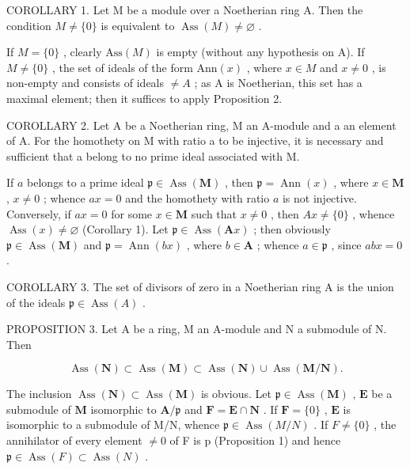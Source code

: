 COROLLARY 1. Let M be a module over a Noetherian ring A. Then the condition \(M \neq \{0\}\) is equivalent to \(\operatorname{Ass}(M) \neq \varnothing\) .

If \(M = \{0\}\) , clearly \(\text{Ass}(M)\) is empty (without any hypothesis on A). If \(M \neq \{0\}\) , the set of ideals of the form \(\text{Ann}(x)\) , where \(x \in M\) and \(x \neq 0\) , is non-empty and consists of ideals \(\neq A\) ; as A is Noetherian, this set has a maximal element; then it suffices to apply Proposition 2.

COROLLARY 2. Let A be a Noetherian ring, M an A-module and a an element of A. For the homothety on M with ratio a to be injective, it is necessary and sufficient that a belong to no prime ideal associated with M.

If \(a\) belongs to a prime ideal \(\mathfrak{p} \in \operatorname{Ass}(\mathbf{M})\) , then \(\mathfrak{p} = \operatorname{Ann}(x)\) , where \(x \in \mathbf{M}\) , \(x \neq 0\) ; whence \(ax = 0\) and the homothety with ratio \(a\) is not injective. Conversely, if \(ax = 0\) for some \(x \in \mathbf{M}\) such that \(x \neq 0\) , then \(Ax \neq \{0\}\) , whence \(\operatorname{Ass}(x) \neq \varnothing\) (Corollary 1). Let \(\mathfrak{p} \in \operatorname{Ass}(\mathbf{A}x)\) ; then obviously \(\mathfrak{p} \in \operatorname{Ass}(\mathbf{M})\) and \(\mathfrak{p} = \operatorname{Ann}(bx)\) , where \(b \in \mathbf{A}\) ; whence \(a \in \mathfrak{p}\) , since \(abx = 0\) .

COROLLARY 3. The set of divisors of zero in a Noetherian ring A is the union of the ideals \(\mathfrak{p} \in \operatorname{Ass}(A)\) .

PROPOSITION 3. Let A be a ring, M an A-module and N a submodule of N. Then

\[
\operatorname{Ass} (\mathbf {N}) \subset \operatorname{Ass} (\mathbf {M}) \subset \operatorname{Ass} (\mathbf {N}) \cup \operatorname{Ass} (\mathbf {M} / \mathbf {N}).\tag{2}
\]

The inclusion \(\operatorname{Ass}(\mathbf{N}) \subset \operatorname{Ass}(\mathbf{M})\) is obvious. Let \(\mathfrak{p} \in \operatorname{Ass}(\mathbf{M})\) , \(\mathbf{E}\) be a submodule of \(\mathbf{M}\) isomorphic to \(\mathbf{A} / \mathfrak{p}\) and \(\mathbf{F} = \mathbf{E} \cap \mathbf{N}\) . If \(\mathbf{F} = \{0\}\) , \(\mathbf{E}\) is isomorphic to a submodule of M/N, whence \(\mathfrak{p} \in \operatorname{Ass}(M/N)\) . If \(F \neq \{0\}\) , the annihilator of every element \(\neq 0\) of F is p (Proposition 1) and hence \(\mathfrak{p} \in \operatorname{Ass}(F) \subset \operatorname{Ass}(N)\) .

